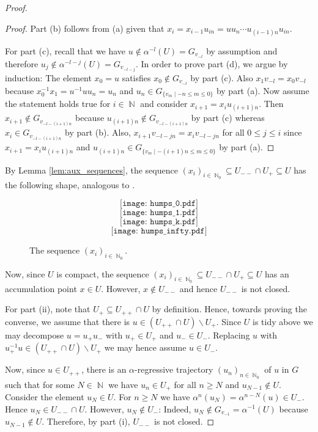 \documentclass{article}
\DeclareMathOperator\bbN{\mathbb{N}}
\theoremstyle{definition}
\begin{document}
\begin{proof}
\begin{proof}
Part (b) follows from (a) given that $x_{i}=x_{i-1}u_{in}=uu_{n}\cdots u_{(i-1)n}u_{in}$.

For part (c), recall that we have $u\not\in\alpha^{-l}(U)=G_{v_{-l}}$ by assumption and therefore $u_{j}\not\in\alpha^{-l-j}(U)=G_{v_{-l-j}}$. In order to prove part (d), we argue by induction: The element $x_{0}=u$ satisfies $x_{0}\not\in G_{v_{-l}}$ by part (c). Also $x_{1}v_{-l}=x_{0}v_{-l}$ because $x_{0}^{-1}x_{1}=u^{-1}uu_{n}=u_{n}$ and $u_{n}\in G_{\{v_{m}\mid -n\le m\le 0\}}$ by part (a). Now assume the statement holds true for $i\in\bbN$ and consider $x_{i+1}=x_{i}u_{(i+1)n}$. Then $x_{i+1}\not\in G_{v_{-l-(i+1)n}}$ because $u_{(i+1)n}\not\in G_{v_{-l-(i+1)n}}$ by part (c) whereas $x_{i}\in G_{v_{-l-(i+1)n}}$ by part (b). Also, $x_{i+1}v_{-l-jn}=x_{i}v_{-l-jn}$ for all $0\le j\le i$ since $x_{i+1}=x_{i}u_{(i+1)n}$ and $u_{(i+1)n}\in G_{\{v_{m}\mid -(i+1)n\le m\le 0\}}$ by part (a).
\end{proof}

By Lemma \ref{lem:aux_sequences}, the sequence $(x_{i})_{i\in\bbN_{0}}\subseteq U_{--}\cap U_{+}\subseteq U$ has the following shape, analogous to \cite[Figure 1]{Moe02}.
\begin{figure}[ht]
\begin{displaymath}
  \texttt{[image: humps\_0.pdf]}
\end{displaymath}
\begin{displaymath}
  \texttt{[image: humps\_1.pdf]}
\end{displaymath}
\begin{displaymath}
  \texttt{[image: humps\_k.pdf]}
\end{displaymath}
\begin{displaymath}
  \texttt{[image: humps\_infty.pdf]}
\end{displaymath}
\caption{The sequence $(x_{i})_{i\in\bbN_{0}}$.}
\end{figure}

Now, since $U$ is compact, the sequence $(x_{i})_{i\in\bbN_{0}}\subseteq U_{--}\cap U_{+}\subseteq U$ has an accumulation point $x\in U$. However, $x\not\in U_{--}$ and hence $U_{--}$ is not closed.

For part (ii), note that $U_{+}\subseteq U_{++}\cap U$ by definition. Hence, towards proving the converse, we assume that there is $u\in(U_{++}\cap U)\backslash U_{+}$. Since $U$ is tidy above we may decompose $u=u_{+}u_{-}$ with $u_{+}\in U_{+}$ and $u_{-}\in U_{-}$. Replacing $u$ with $u_{+}^{-1}u\in(U_{++}\cap U)\backslash U_{+}$ we may hence assume $u\in U_{-}$.

Now, since $u\in U_{++}$, there is an $\alpha$-regressive trajectory $(u_{n})_{n\in\bbN_{0}}$ of $u$ in $G$ such that for some $N\in\bbN$ we have $u_{n}\in U_{+}$ for all $n\ge N$ and $u_{N-1}\not\in U$. Consider the element $u_{N}\in U$. For $n\ge N$ we have $\alpha^{n}(u_{N})=\alpha^{n-N}(u)\in U_{-}$. Hence $u_{N}\in U_{--}\cap U$. However, $u_{N}\not\in U_{-}$: Indeed, $u_{N}\not\in G_{v_{-1}}=\alpha^{-1}(U)$ because $u_{N-1}\not\in U$. Therefore, by part (i), $U_{--}$ is not closed.
\end{proof}
\end{document}
